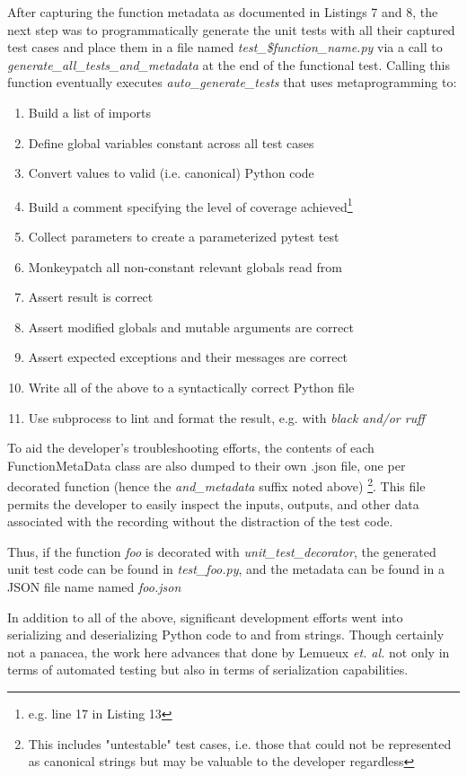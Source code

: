 After capturing the function metadata as documented in Listings 7 and 8, 
the next step was to programmatically generate the unit tests with all their 
captured test cases and place them in a file named 
\textit{test\_\$function\_name.py}
via a call to \textit{generate\_all\_tests\_and\_metadata} at the end of 
the functional test.
Calling this function eventually executes \textit{auto\_generate\_tests} 
that uses metaprogramming to:
\begin{enumerate}
  \item Build a list of imports
  \item Define global variables constant across all test cases
  \item Convert values to valid (i.e. canonical) Python code
  \item Build a comment specifying the level of coverage achieved\footnote{e.g. line 17 in Listing 13}
  \item Collect parameters to create a parameterized pytest test
  \item Monkeypatch all non-constant relevant globals read from
  \item Assert result is correct
  \item Assert modified globals and mutable arguments are correct
  \item Assert expected exceptions and their messages are correct
  \item Write all of the above to a syntactically correct Python file
  \item Use subprocess to lint and format the result, e.g. with \textit{black and/or ruff}
\end{enumerate}

To aid the developer's troubleshooting efforts, the contents of each FunctionMetaData
class are also dumped to their own .json file, one per decorated function (hence
the \textit{and\_metadata} suffix noted above) \footnote{This includes 
"untestable" test cases, i.e. those that could not be represented as canonical strings
but may be valuable to the developer regardless}.  This file permits the 
developer to easily inspect the inputs, outputs, and other data
associated with the recording without the distraction of the test code.

Thus, if the function \textit{foo} is decorated with \textit{unit\_test\_decorator},
the generated unit test code can be found in \textit{test\_foo.py}, and the 
metadata can be found in a JSON file name named \textit{foo.json}

In addition to all of the above, significant development efforts went into 
serializing and deserializing Python code to and from strings.  Though
certainly not a panacea, the work here advances that done by 
Lemueux \textit{et. al.} \cite{lemieux2023codamosa} not only in terms of 
automated testing but also in terms of serialization capabilities.


